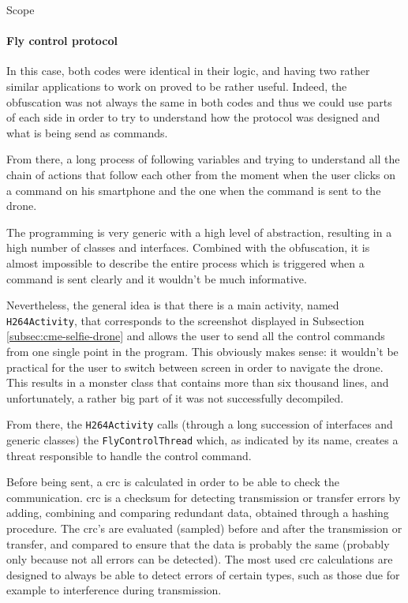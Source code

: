 \begin{chaptercover}{Scope}
\paragraph{Fly control protocol} In this case, both codes were identical in their logic, and having two rather similar applications to work on proved to be rather useful. Indeed, the obfuscation was not always the same in both codes and thus we could use parts of each side in order to try to understand how the protocol was designed and what is being send as commands.

From there, a long process of following variables and trying to understand all the chain of actions that follow each other from the moment when the user clicks on a command on his smartphone and the one when the command is sent to the drone.

The programming is very generic with a high level of abstraction, resulting in a high number of classes and interfaces. Combined with the obfuscation, it is almost impossible to describe the entire process which is triggered when a command is sent clearly and it wouldn’t be much informative.

Nevertheless, the general idea is that there is a main activity, named \texttt{H264Activity}, that corresponds to the screenshot displayed in Subsection \ref{subsec:cme-selfie-drone} and allows the user to send all the control commands from one single point in the program. This obviously makes sense: it wouldn’t be practical for the user to switch between screen in order to navigate the drone. This results in a monster class that contains more than six thousand lines, and unfortunately, a rather big part of it was not successfully decompiled.

From there, the \texttt{H264Activity} calls (through a long succession of interfaces and generic classes) the \texttt{FlyControlThread} which, as indicated by its name, creates a threat responsible to handle the control command.

Before being sent, a \acrfull{crc} is calculated in order to be able to check the communication. \acrshort{crc} is a checksum for detecting transmission or transfer errors by adding, combining and comparing redundant data, obtained through a hashing procedure. The \acrshort{crc}'s are evaluated (sampled) before and after the transmission or transfer, and compared to ensure that the data is probably the same (probably only because not all errors can be detected). The most used \acrshort{crc} calculations are designed to always be able to detect errors of certain types, such as those due for example to interference during transmission.


\end{chaptercover}
